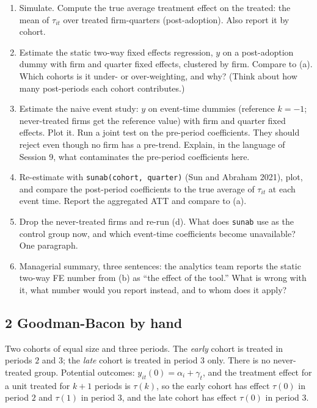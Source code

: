 \documentclass[11pt]{article}
\begin{document}
\begin{enumerate}[label=(\alph*)]
\item Simulate. Compute the true average treatment effect on the treated: the mean of $\tau_{it}$
over treated firm-quarters (post-adoption). Also report it by cohort.
\item Estimate the static two-way fixed effects regression, $y$ on a post-adoption dummy with firm
and quarter fixed effects, clustered by firm. Compare to (a). Which cohorts is it under- or
over-weighting, and why? (Think about how many post-periods each cohort contributes.)
\item Estimate the naive event study: $y$ on event-time dummies (reference $k = -1$; never-treated
firms get the reference value) with firm and quarter fixed effects. Plot it. Run a joint test on the
pre-period coefficients. They should reject even though no firm has a pre-trend. Explain, in the
language of Session 9, what contaminates the pre-period coefficients here.
\item Re-estimate with \texttt{sunab(cohort, quarter)} (Sun and Abraham 2021), plot, and compare the
post-period coefficients to the true average of $\tau_{it}$ at each event time. Report the aggregated
ATT and compare to (a).
\item Drop the never-treated firms and re-run (d). What does \texttt{sunab} use as the control group
now, and which event-time coefficients become unavailable? One paragraph.
\item Managerial summary, three sentences: the analytics team reports the static two-way FE number
from (b) as ``the effect of the tool.'' What is wrong with it, what number would you report instead,
and to whom does it apply?
\end{enumerate}

\subsection*{2 Goodman-Bacon by hand}

Two cohorts of equal size and three periods. The \emph{early} cohort is treated in periods $2$ and
$3$; the \emph{late} cohort is treated in period $3$ only. There is no never-treated group. Potential
outcomes: $y_{it}(0) = \alpha_{i} + \gamma_{t}$, and the treatment effect for a unit treated for
$k + 1$ periods is $\tau(k)$, so the early cohort has effect $\tau(0)$ in period $2$ and
$\tau(1)$ in period $3$, and the late cohort has effect $\tau(0)$ in period $3$.
\end{document}
